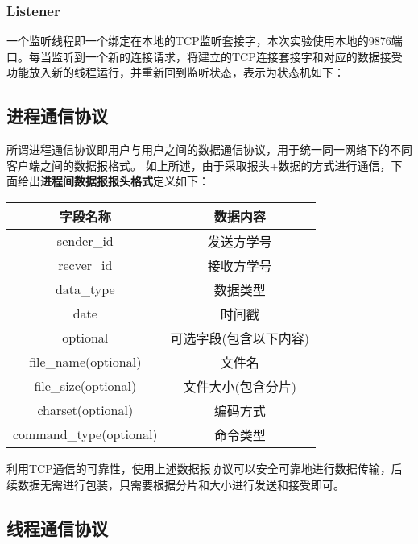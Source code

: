 \documentclass[UTF8]{ctexart}
\begin{document}
\subsubsection{Listener}\label{listener}
一个监听线程即一个绑定在本地的TCP监听套接字，本次实验使用本地的9876端口。每当监听到一个新的连接请求，将建立的TCP连接套接字和对应的数据接受功能放入新的线程运行，并重新回到监听状态，表示为状态机如下：


\subsection{进程通信协议}\label{progress}
所谓进程通信协议即用户与用户之间的数据通信协议，用于统一同一网络下的不同客户端之间的数据报格式。
如上所述，由于采取报头+数据的方式进行通信，下面给出\textbf{进程间数据报报头格式}定义如下：
\begin{table}[H]
    \centering
    \begin{tabular}{cc}
        \hline
        字段名称 & 数据内容 \\
        \hline
        sender\_id & 发送方学号\\
        recver\_id & 接收方学号\\
        data\_type & 数据类型\\
        date & 时间戳\\
        optional & 可选字段(包含以下内容)\\
        file\_name(optional) & 文件名\\
        file\_size(optional) & 文件大小(包含分片)\\
        charset(optional) & 编码方式\\
        command\_type(optional) & 命令类型\\
        \hline
    \end{tabular}
\end{table}

利用TCP通信的可靠性，使用上述数据报协议可以安全可靠地进行数据传输，后续数据无需进行包装，只需要根据分片和大小进行发送和接受即可。



\subsection{线程通信协议}\label{thread}
\end{document}
